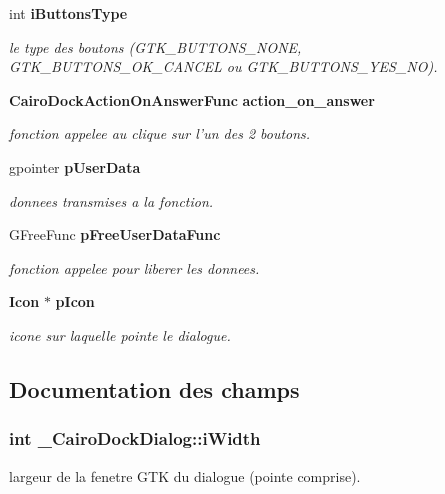 \begin{CompactItemize}
int {\bf iButtonsType}
\begin{CompactList}\small\item\em le type des boutons (GTK\_\-BUTTONS\_\-NONE, GTK\_\-BUTTONS\_\-OK\_\-CANCEL ou GTK\_\-BUTTONS\_\-YES\_\-NO). \item\end{CompactList}\item 
{\bf CairoDockActionOnAnswerFunc} {\bf action\_\-on\_\-answer}
\begin{CompactList}\small\item\em fonction appelee au clique sur l'un des 2 boutons. \item\end{CompactList}\item 
gpointer {\bf pUserData}
\begin{CompactList}\small\item\em donnees transmises a la fonction. \item\end{CompactList}\item 
GFreeFunc {\bf pFreeUserDataFunc}
\begin{CompactList}\small\item\em fonction appelee pour liberer les donnees. \item\end{CompactList}\item 
{\bf Icon} $\ast$ {\bf pIcon}
\begin{CompactList}\small\item\em icone sur laquelle pointe le dialogue. \item\end{CompactList}\end{CompactItemize}


\subsection{Documentation des champs}
\subsubsection{\setlength{\rightskip}{0pt plus 5cm}int {\bf \_\-CairoDockDialog::iWidth}}\label{struct__CairoDockDialog_551d2daa1bf3a49f330609b2ec916636}


largeur de la fenetre GTK du dialogue (pointe comprise). 

